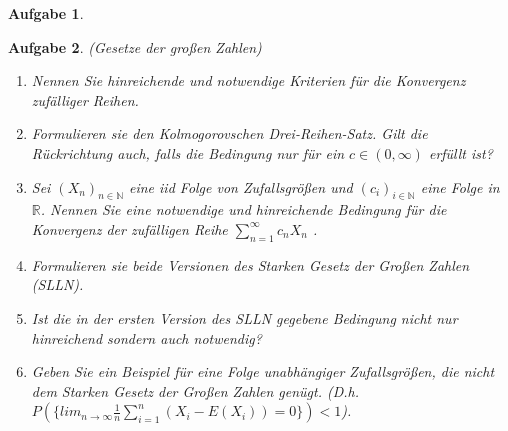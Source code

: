 \documentclass[11pt, a4paper, ngerman]{article}
\newcommand{\N}{\mathbb{N}}
\newcommand{\R}{\mathbb{R}}
\newtheorem{aufgabe}{Aufgabe}
\begin{document}
\begin{aufgabe}
\end{aufgabe}

\begin{aufgabe} (Gesetze der großen Zahlen)
    \begin{enumerate}
        \item 
        Nennen Sie hinreichende und notwendige Kriterien für die Konvergenz zufälliger Reihen. 
        \item
        Formulieren sie den Kolmogorovschen Drei-Reihen-Satz. Gilt die Rückrichtung auch, falls die Bedingung nur für ein $c \in (0, \infty)$ erfüllt ist?
        \item 
        Sei $(X_n)_{n \in \N}$ eine iid Folge von Zufallsgrößen und $(c_i)_{i \in \N}$ eine Folge in $\R$. 
        Nennen Sie eine notwendige und hinreichende Bedingung für die Konvergenz der zufälligen Reihe $\sum_{n=1}^{\infty} c_n X_n$ .  
        \item 
        Formulieren sie beide Versionen des Starken Gesetz der Großen Zahlen (SLLN).
        \item
        Ist die in der ersten Version des SLLN gegebene Bedingung nicht nur hinreichend sondern auch notwendig?
        \item 
        Geben Sie ein Beispiel für eine Folge unabhängiger Zufallsgrößen, die nicht dem Starken Gesetz der Großen Zahlen genügt. 
        \newline   
        (D.h. $P( \{ lim_{n \to \infty} \frac{1}{n}\sum_{i=1}^n (X_i - E(X_i)) = 0 \} ) < 1$). 
    \end{enumerate} 
\end{aufgabe}
\end{document}
